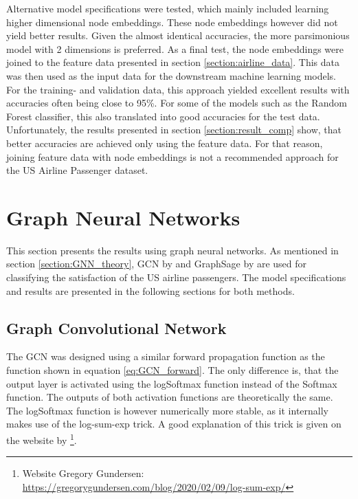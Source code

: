   \noindent Alternative model specifications were tested, which mainly included
  learning higher dimensional node embeddings. These node embeddings however
  did not yield better results. Given the almost identical accuracies, the more
  parsimonious model with 2 dimensions is preferred. As a final test, the node
  embeddings were joined to the feature data presented in section 
  \ref{section:airline_data}. This data was then used as the input data for the
  downstream machine learning models. For the training- and validation data,
  this approach yielded excellent results with accuracies often being close to 
  95\%. For some of the models such as the Random Forest classifier, this also
  translated into good accuracies for the test data. Unfortunately, the results 
  presented in section \ref{section:result_comp} show, that better accuracies 
  are achieved only using the feature data. For that reason, joining feature 
  data with node embeddings is not a recommended approach for the US Airline 
  Passenger dataset.

  \section{Graph Neural Networks}

  This section presents the results using graph neural networks. As
  mentioned in section \ref{section:GNN_theory}, GCN by \cite{kipf2016semi} and
  GraphSage by \cite{hamilton2017inductive} are used for classifying the
  satisfaction of the US airline passengers. The model specifications 
  and results are presented in the following sections for both methods.

  \subsection{Graph Convolutional Network}

  The GCN was designed using a similar forward propagation function as the
  function shown in equation \ref{eq:GCN_forward}. The only difference is, that
  the output layer is activated using the logSoftmax function instead of the
  Softmax function. The outputs of both activation functions are theoretically 
  the same. The logSoftmax function is however numerically more stable, as it 
  internally makes use of the log-sum-exp trick. A good explanation of this
  trick is given on the website by \cite{gundersen2020}\footnote{Website 
  Gregory Gundersen: \\\url{https://gregorygundersen.com/blog/2020/02/09/log-sum-exp/}}.

